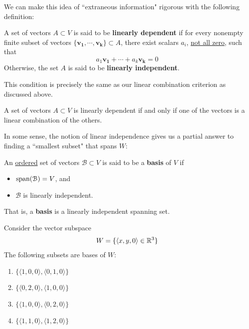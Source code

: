     We can make this idea of ``extraneous information" rigorous with the following definition:
    
     \begin{definition}
    A set of vectors $A \subset V$ is said to be \textbf{linearly dependent} if for every nonempty finite subset of vectors $\{\bm{v_1}, \cdots, \bm{v_k}\} \subset A$, there exist scalars $a_i$, \underline{not all zero}, such that $$a_1\bm{v_1} + \cdots + a_k\bm{v_k} = 0$$ Otherwise, the set $A$ is said to be \textbf{linearly independent}.
    \end{definition}
    
    This condition is precisely the same as our linear combination criterion as discussed above. 
    
    \begin{proposition}
     A set of vectors $A \subset V$ is linearly dependent if and only if one of the vectors is a linear combination of the others.
    \end{proposition}
    
    In some sense, the notion of linear independence gives us a partial answer to finding a ``smallest subset" that spans $W$:
    
    \begin{definition}
    An \underline{ordered} set of vectors $\mathcal{B} \subset V$ is said to be a \textbf{basis} of $V$ if 
     \begin{itemize}
        \item $\textnormal{span}(\mathcal{B}) = V$, and 
        \item $\mathcal{B}$ is linearly independent.
    \end{itemize}
    
    That is, a \textbf{basis} is a linearly independent spanning set.
    \end{definition}
    
    \begin{example}
    Consider the vector subspace $$W = \{\langle x, y, 0\rangle \in \mathbb{R}^3 \}$$
    The following subsets are bases of $W$:
    
    \begin{enumerate}[label=(\roman*)]
        \item $\{\langle 1,0,0\rangle, \langle 0,1,0\rangle\}$
        \item $\{\langle 0,2,0\rangle, \langle 1,0,0\rangle\}$
        \item $\{\langle 1,0,0\rangle, \langle 0,2,0\rangle\}$
        \item $\{\langle 1,1,0\rangle, \langle 1,2,0\rangle\}$
    \end{enumerate}
    \end{example}
    

